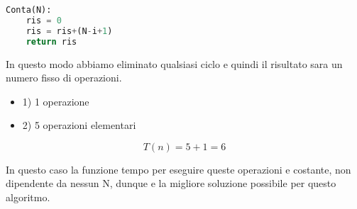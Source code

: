\begin{lstlisting}[language=Python]
Conta(N):
	ris = 0
	ris = ris+(N-i+1)
	return ris
\end{lstlisting}

In questo modo abbiamo eliminato qualsiasi ciclo e quindi il risultato sara un numero fisso di operazioni.

\begin{itemize}
\item 1) 1 operazione
\item 2) 5 operazioni elementari
\end{itemize}

$$T(n) = 5+1 = 6$$

In questo caso la funzione tempo per eseguire queste operazioni e costante, non dipendente da nessun N, dunque e la migliore soluzione possibile per questo algoritmo.


